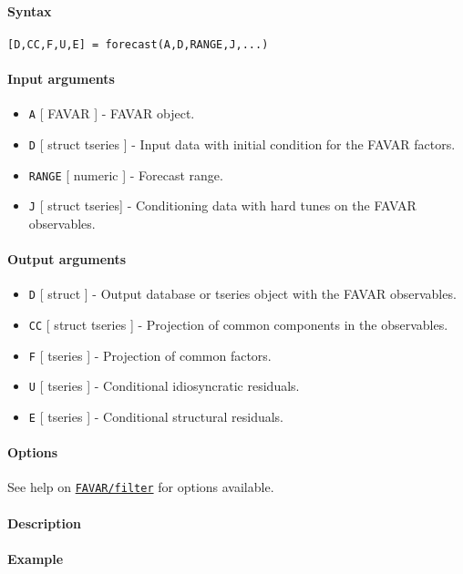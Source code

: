 


	\paragraph{Syntax}\label{syntax}

\begin{verbatim}
[D,CC,F,U,E] = forecast(A,D,RANGE,J,...)
\end{verbatim}

\paragraph{Input arguments}\label{input-arguments}

\begin{itemize}
\item
  \texttt{A} {[} FAVAR {]} - FAVAR object.
\item
  \texttt{D} {[} struct \textbar{} tseries {]} - Input data with initial
  condition for the FAVAR factors.
\item
  \texttt{RANGE} {[} numeric {]} - Forecast range.
\item
  \texttt{J} {[} struct \textbar{} tseries{]} - Conditioning data with
  hard tunes on the FAVAR observables.
\end{itemize}

\paragraph{Output arguments}\label{output-arguments}

\begin{itemize}
\item
  \texttt{D} {[} struct {]} - Output database or tseries object with the
  FAVAR observables.
\item
  \texttt{CC} {[} struct \textbar{} tseries {]} - Projection of common
  components in the observables.
\item
  \texttt{F} {[} tseries {]} - Projection of common factors.
\item
  \texttt{U} {[} tseries {]} - Conditional idiosyncratic residuals.
\item
  \texttt{E} {[} tseries {]} - Conditional structural residuals.
\end{itemize}

\paragraph{Options}\label{options}

See help on \href{FAVAR/filter}{\texttt{FAVAR/filter}} for options
available.

\paragraph{Description}\label{description}

\paragraph{Example}\label{example}


